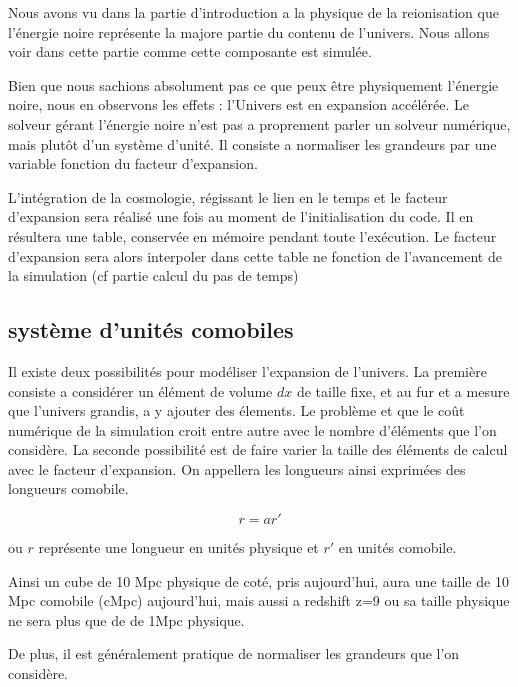 Nous avons vu dans la partie d'introduction a la physique de la reionisation que l'énergie noire représente la majore partie du contenu de l'univers.
Nous allons voir dans cette partie comme cette composante est simulée.

Bien que nous sachions absolument pas ce que peux être physiquement l'énergie noire, nous en observons les effets : l'Univers est en expansion accélérée.
Le solveur gérant l'énergie noire n'est pas a proprement parler un solveur numérique, mais plutôt d'un système d'unité. %
Il consiste a normaliser les grandeurs par une variable fonction du facteur d'expansion.


L'intégration de la cosmologie, régissant le lien en le temps et le facteur d'expansion sera réalisé une fois au moment de l'initialisation du code. %
Il en résultera une table, conservée en mémoire pendant toute l'exécution.
Le facteur d'expansion sera alors interpoler dans cette table ne fonction de l'avancement de la simulation (cf partie calcul du pas de temps) %

\subsection{système d'unités comobiles}
Il existe deux possibilités pour modéliser l'expansion de l'univers.
La première consiste a considérer un élément de volume $dx$ de taille fixe, et au fur et a mesure que l'univers grandis, a y ajouter des élements.
Le problème et que le coût numérique de la simulation croit entre autre avec le nombre d'éléments que l'on considère.
La seconde possibilité est de faire varier la taille des éléments de calcul avec le facteur d'expansion.
On appellera les longueurs ainsi exprimées des longueurs comobile.

\begin{equation}
r=a r'
\end{equation}

ou $r$ représente une longueur en unités physique et $r'$ en unités comobile.

Ainsi un cube de 10 Mpc physique de coté, pris aujourd'hui, aura une taille de 10 Mpc comobile (cMpc) aujourd'hui, mais aussi a redshift z=9 ou sa taille physique ne sera plus que de de 1Mpc physique.

De plus, il est généralement pratique de normaliser les grandeurs que l'on considère. 

